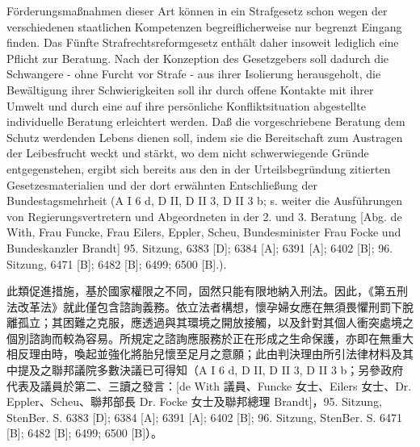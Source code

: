 \documentclass[12pt]{article}
\begin{document}
\syncleft
\begin{sourcepara}
Förderungsmaßnahmen dieser Art können in ein Strafgesetz schon wegen der verschiedenen staatlichen Kompetenzen begreiflicherweise nur begrenzt Eingang finden. Das Fünfte Strafrechtsreformgesetz enthält daher insoweit lediglich eine Pflicht zur Beratung. Nach der Konzeption des Gesetzgebers soll dadurch die Schwangere - ohne Furcht vor Strafe - aus ihrer Isolierung herausgeholt, die Bewältigung ihrer Schwierigkeiten soll ihr durch offene Kontakte mit ihrer Umwelt und durch eine auf ihre persönliche Konfliktsituation abgestellte individuelle Beratung erleichtert werden. Daß die vorgeschriebene Beratung dem Schutz werdenden Lebens dienen soll, indem sie die Bereitschaft zum Austragen der Leibesfrucht weckt und stärkt, wo dem nicht schwerwiegende Gründe entgegenstehen, ergibt sich bereits aus den in der Urteilsbegründung zitierten Gesetzesmaterialien und der dort erwähnten Entschließung der Bundestagsmehrheit (A I 6 d, D II, D II 3, D II 3 b; s. weiter die Ausführungen von Regierungsvertretern und Abgeordneten in der 2. und 3. Beratung [Abg. de With, Frau Funcke, Frau Eilers, \abbrDr{} Eppler, Scheu, Bundesminister Frau \abbrDr{} Focke und Bundeskanzler Brandt] 95. Sitzung, \abbrStenBer{} \abbrS{} 6383 [D]; 6384 [A]; 6391 [A]; 6402 [B]; 96. Sitzung, \abbrStenBer{} \abbrS{} 6471 [B]; 6482 [B]; 6499; 6500 [B].).
\end{sourcepara}
\begin{transpara}
此類促進措施，基於國家權限之不同，固然只能有限地納入刑法。因此，《第五刑法改革法》就此僅包含諮詢義務。依立法者構想，懷孕婦女應在無須畏懼刑罰下脫離孤立；其困難之克服，應透過與其環境之開放接觸，以及針對其個人衝突處境之個別諮詢而較為容易。所規定之諮詢應服務於正在形成之生命保護，亦即在無重大相反理由時，喚起並強化將胎兒懷至足月之意願；此由判決理由所引法律材料及其中提及之聯邦議院多數決議已可得知（A I 6 d, D II, D II 3, D II 3 b；另參政府代表及議員於第二、三讀之發言：[de With 議員、Funcke 女士、Eilers 女士、Dr. Eppler、Scheu、聯邦部長 Dr. Focke 女士及聯邦總理 Brandt]，95. Sitzung, StenBer. S. 6383 [D]; 6384 [A]; 6391 [A]; 6402 [B]; 96. Sitzung, StenBer. S. 6471 [B]; 6482 [B]; 6499; 6500 [B]）。
\end{transpara}
\end{document}
